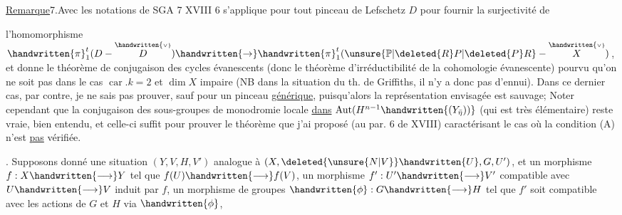 \uline{Remarque}7.Avec les notations de SGA 7 XVII\deleted{,}I\handwritten{,} 6 s'applique pour tout pinceau de Lefschetz $D$ pour fournir la surjectivité de

l'homomorphisme $\handwritten{\pi}_1^t(D-\overset{\handwritten{\scriptscriptstyle\vee}}{D})\handwritten{\rightarrow}\handwritten{\pi}_1^t(\unsure{\mathbb{P}|\deleted{R}P|\deleted{P}R}-\overset{\handwritten{\scriptscriptstyle\vee}}{X})$, et donne le théorème de conjugaison des cycles évanescents (donc le théorème d'irréductibilité de la cohomologie évanescente) pourvu qu'on ne soit pas dans le cas $\operatorname{car}.k=2$ et $\dim X$ impaire (NB  dans la situation du th. de Griffiths, il n'y a donc pas d'ennui). Dans ce dernier cas, par contre, je ne sais  pas prouver, sauf pour un pinceau \uline{générique}, puisqu'alors la représentation envisagée est sauvage;  Noter cependant que la conjugaison des sous-groupes de monodromie locale \uline{dans} $\operatorname{Aut}(H^{n-1}\handwritten{(Y_{\bar{\eta}}))}$ (qui est très élémentaire) reste vraie, bien entendu, et celle-ci suffit pour prouver le théorème que j'ai proposé (au par. 6 de XVIII) caractérisant le cas où la condition (A) n'est \uline{pas} vérifiée.


. Supposons donné une situation $(Y,V,H,V')$ analogue à $(X,\deleted{\unsure{N|V}}\handwritten{U},G,U')$, et un morphisme $f:X\handwritten{\longrightarrow}Y$ tel que $f(U)\handwritten{\longrightarrow}f(V)$, un morphisme $f':U'\handwritten{\longrightarrow}V'$ compatible avec $U\handwritten{\longrightarrow}V$ induit par $f$, un morphisme de groupes $\handwritten{\phi}:G\handwritten{\longrightarrow}H$ tel que  $f'$ soit compatible avec les actions de $G$ et $H$ via $\handwritten{\phi}$, 

